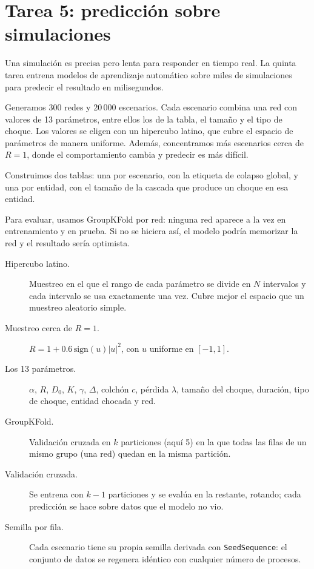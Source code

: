 \section{Tarea 5: predicción sobre simulaciones}

\begin{decir}
Una simulación es precisa pero lenta para responder en tiempo real. La quinta tarea
entrena modelos de aprendizaje automático sobre miles de simulaciones para predecir el
resultado en milisegundos.

Generamos 300 redes y 20\,000 escenarios. Cada escenario combina una red con valores de
13 parámetros, entre ellos los de la tabla, el tamaño y el tipo de choque. Los valores se
eligen con un hipercubo latino, que cubre el espacio de parámetros de manera uniforme.
Además, concentramos más escenarios cerca de $R=1$, donde el comportamiento cambia y
predecir es más difícil.

Construimos dos tablas: una por escenario, con la etiqueta de colapso global, y una por
entidad, con el tamaño de la cascada que produce un choque en esa entidad.

Para evaluar, usamos GroupKFold por red: ninguna red aparece a la vez en entrenamiento y
en prueba. Si no se hiciera así, el modelo podría memorizar la red y el resultado sería
optimista.
\end{decir}
\begin{terminos}
\begin{description}
\item[Hipercubo latino.] Muestreo en el que el rango de cada parámetro se divide en $N$
intervalos y cada intervalo se usa exactamente una vez. Cubre mejor el espacio que un
muestreo aleatorio simple.
\item[Muestreo cerca de $R=1$.] $R=1+0.6\,\mathrm{sign}(u)|u|^2$, con $u$ uniforme en
$[-1,1]$.
\item[Los 13 parámetros.] $\alpha$, $R$, $D_0$, $K$, $\gamma$, $\Delta$, colchón $c$,
pérdida $\lambda$, tamaño del choque, duración, tipo de choque, entidad chocada y red.
\item[GroupKFold.] Validación cruzada en $k$ particiones (aquí 5) en la que todas las
filas de un mismo grupo (una red) quedan en la misma partición.
\item[Validación cruzada.] Se entrena con $k-1$ particiones y se evalúa en la restante,
rotando; cada predicción se hace sobre datos que el modelo no vio.
\item[Semilla por fila.] Cada escenario tiene su propia semilla derivada con
\texttt{SeedSequence}: el conjunto de datos se regenera idéntico con cualquier número de
procesos.
\end{description}
\end{terminos}


